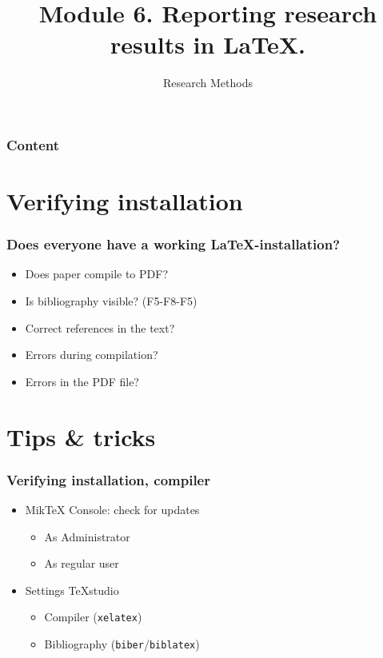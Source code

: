 \documentclass[aspectratio=169]{beamer}
\title{Module 6. Reporting research results in \LaTeX{}.}
\subtitle{Research Methods}
\author{\lecturers}   %
\date{\academicyear}
\begin{document}
\begin{frame}
  \maketitle
\end{frame}

\begin{frame}
  \frametitle{Content}

  \tableofcontents
\end{frame}

\section{Verifying installation}

\begin{frame}
  \frametitle{Does everyone have a working {\LaTeX}-installation?}

  \begin{itemize}
   \item Does paper compile to PDF?
   \item Is bibliography visible? (F5-F8-F5)
   \item Correct references in the text?
   \item Errors during compilation?
   \item Errors in the PDF file?
  \end{itemize}

\end{frame}

\section{Tips \& tricks}


\begin{frame}
  \frametitle{Verifying installation, compiler}

  \begin{itemize}
    \item Mik{\TeX} Console: check for updates
          \begin{itemize}
            \item As Administrator
            \item As regular user
          \end{itemize}
    \item Settings TeXstudio
          \begin{itemize}
            \item Compiler (\texttt{xelatex})
            \item Bibliography (\texttt{biber}/\texttt{biblatex})
          \end{itemize}
  \end{itemize}

\end{frame}
\end{document}
